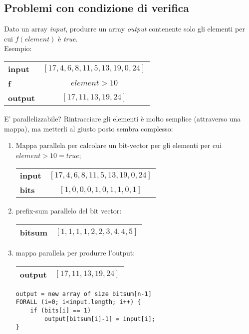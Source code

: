\subsection{Problemi con condizione di verifica}
Dato un array \textit{input}, produrre un array \textit{output} contenente solo gli elementi per cui $f(element)$ è \textit{true}. \\
Esempio:
\begin{center}
	\begin{tabular}{| l | c |}
		\hline
		\textbf{input} & $[17,4,6,8,11,5,13,19,0,24]$ \\
		\textbf{f} & $element > 10$ \\
		\textbf{output} & $[17,11,13,19,24]$ \\
		\hline
	\end{tabular}
\end{center}
E' parallelizzabile? Rintracciare gli elementi è molto semplice (attraverso una mappa), ma metterli al giusto posto sembra complesso:
\begin{enumerate}
	\item Mappa parallela per calcolare un bit-vector per gli elementi per cui $element > 10 = true$;
	\begin{center}
		\begin{tabular}{| l | c |}
			\hline
			\textbf{input} & $[17,4,6,8,11,5,13,19,0,24]$ \\
			\textbf{bits} & $[1,0,0,0,1,0,1,1,0,1]$ \\
			\hline
		\end{tabular}
	\end{center}
	\item prefix-sum parallelo del bit vector:
	\begin{center}
		\begin{tabular}{| l | c |}
			\hline
			\textbf{bitsum} & $[1,1,1,1,2,2,3,4,4,5]$ \\
			\hline
		\end{tabular}
	\end{center}
	\item mappa parallela per produrre l'output:
	\begin{center}
		\begin{tabular}{| l | c |}
			\hline
			\textbf{output} & $[17,11,13,19,24]$ \\
			\hline
		\end{tabular}
		\begin{lstlisting}
output = new array of size bitsum[n-1]
FORALL (i=0; i<input.length; i++) {
	if (bits[i] == 1)
		output[bitsum[i]-1] = input[i];
}
		\end{lstlisting}
	\end{center}
\end{enumerate}

